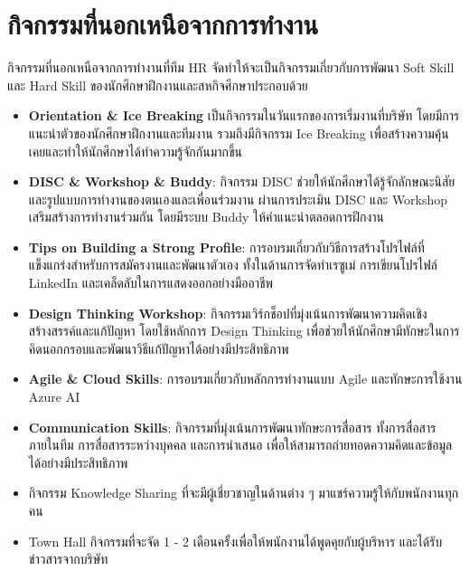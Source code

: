 \clearpage

\section{กิจกรรมที่นอกเหนือจากการทำงาน}
กิจกรรมที่นอกเหนือจากการทำงานที่ทีม HR จัดทำให้จะเป็นกิจกรรมเกี่ยวกับการพัฒนา Soft Skill และ Hard Skill ของนักศึกษาฝึกงานและสหกิจศึกษาประกอบด้วย
\begin{itemize}
      \item \textbf{Orientation \& Ice Breaking} เป็นกิจกรรมในวันแรกของการเริ่มงานที่บริษัท โดยมีการแนะนำตัวของนักศึกษาฝึกงานและทีมงาน รวมถึงมีกิจกรรม Ice Breaking เพื่อสร้างความคุ้นเคยและทำให้นักศึกษาได้ทำความรู้จักกันมากขึ้น
      \item \textbf{DISC \& Workshop \& Buddy}: กิจกรรม DISC ช่วยให้นักศึกษาได้รู้จักลักษณะนิสัยและรูปแบบการทำงานของตนเองและเพื่อนร่วมงาน ผ่านการประเมิน DISC และ Workshop เสริมสร้างการทำงานร่วมกัน โดยมีระบบ Buddy ให้คำแนะนำตลอดการฝึกงาน
      \item \textbf{Tips on Building a Strong Profile}: การอบรมเกี่ยวกับวิธีการสร้างโปรไฟล์ที่แข็งแกร่งสำหรับการสมัครงานและพัฒนาตัวเอง ทั้งในด้านการจัดทำเรซูเม่ การเขียนโปรไฟล์ LinkedIn และเคล็ดลับในการแสดงออกอย่างมืออาชีพ
      \item \textbf{Design Thinking Workshop}: กิจกรรมเวิร์กช็อปที่มุ่งเน้นการพัฒนาความคิดเชิงสร้างสรรค์และแก้ปัญหา โดยใช้หลักการ Design Thinking เพื่อช่วยให้นักศึกษามีทักษะในการคิดนอกกรอบและพัฒนาวิธีแก้ปัญหาได้อย่างมีประสิทธิภาพ
      \item \textbf{Agile \& Cloud Skills}: การอบรมเกี่ยวกับหลักการทำงานแบบ Agile และทักษะการใช้งาน Azure AI
      \item \textbf{Communication Skills}: กิจกรรมที่มุ่งเน้นการพัฒนาทักษะการสื่อสาร ทั้งการสื่อสารภายในทีม การสื่อสารระหว่างบุคคล และการนำเสนอ เพื่อให้สามารถถ่ายทอดความคิดและข้อมูลได้อย่างมีประสิทธิภาพ
      \item กิจกรรม Knowledge Sharing ที่จะมีผู้เชี่ยวชาญในด้านต่าง ๆ มาแชร์ความรู้ให้กับพนักงานทุกคน
      \item Town Hall กิจกรรมที่จะจัด 1 - 2 เดือนครั้งเพื่อให้พนักงานได้พูดคุยกับผู้บริหาร และได้รับข่าวสารจากบริษัท
\end{itemize}